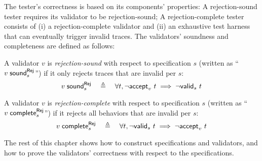 The tester's correctness is based on its components' properties: A
rejection-sound tester requires its validator to be rejection-sound; A
rejection-complete tester consists of (i) a rejection-complete validator and
(ii) an exhaustive test harness that can eventually trigger invalid traces.  The
validators' soundness and completeness are defined as follows:

\begin{definition}
  A validator $v$ is {\em rejection-sound} with respect to specification $s$
  (written as ``$v\;\mathsf{sound}_{s}^\mathsf{Rej}$'') if it only rejects traces that are invalid
  per $s$:
  \[v\;\mathsf{sound}_{s}^\mathsf{Rej}\quad\triangleq\quad\forall t,\neg\mathsf{accept}_{v}~{t}\implies\neg\mathsf{valid}_{s}~{t}\]

  A validator $v$ is {\em rejection-complete} with respect to specification $s$
  (written as ``$v\;\mathsf{complete}_{s}^\mathsf{Rej}$'') if it rejects all behaviors that are
  invalid per $s$:
  \[v\;\mathsf{complete}_{s}^\mathsf{Rej}\quad\triangleq\quad\forall t,\neg\mathsf{valid}_{s}~{t}\implies\neg\mathsf{accept}_{v}~{t}\]
\end{definition}

The rest of this chapter shows how to construct specifications and validators,
and how to prove the validators' correctness with respect to the specifications.
